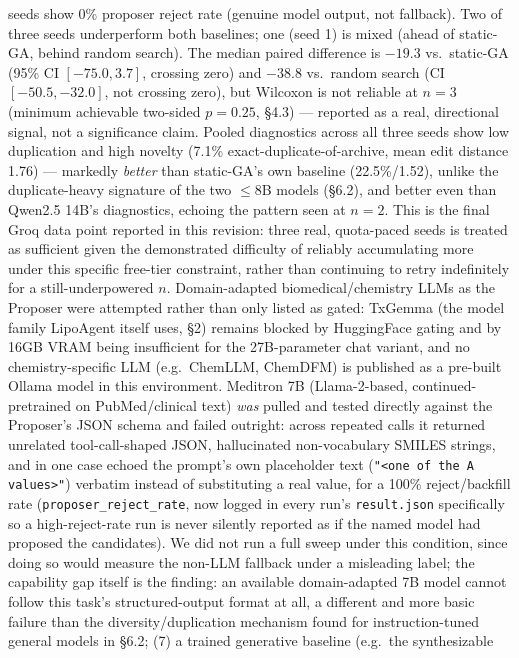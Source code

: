 \documentclass{article}
\begin{document}
seeds show 0\% proposer reject rate (genuine model output, not fallback).
Two of three seeds underperform both baselines; one (seed 1) is mixed
(ahead of static-GA, behind random search). The median paired difference
is $-19.3$ vs.\ static-GA (95\% CI $[-75.0, 3.7]$, crossing zero) and
$-38.8$ vs.\ random search (CI $[-50.5, -32.0]$, not crossing zero), but
Wilcoxon is not reliable at $n=3$ (minimum achievable two-sided
$p=0.25$, \S4.3) --- reported as a real, directional signal, not a
significance claim. Pooled diagnostics across all three seeds show low
duplication and high novelty (7.1\% exact-duplicate-of-archive, mean edit
distance 1.76) --- markedly \emph{better} than static-GA's own baseline
(22.5\%/1.52), unlike the duplicate-heavy signature of the two $\le$8B
models (\S6.2), and better even than Qwen2.5 14B's diagnostics, echoing
the pattern seen at $n=2$. This is the final Groq data point reported in
this revision: three real, quota-paced seeds is treated as sufficient
given the demonstrated difficulty of reliably accumulating more under
this specific free-tier constraint, rather than continuing to retry
indefinitely for a still-underpowered $n$. Domain-adapted biomedical/chemistry LLMs as the Proposer were
attempted rather than only listed as gated: TxGemma (the model family
LipoAgent itself uses, \S2) remains blocked by HuggingFace gating and by
16GB VRAM being insufficient for the 27B-parameter chat variant, and no
chemistry-specific LLM (e.g.\ ChemLLM, ChemDFM) is published as a
pre-built Ollama model in this environment. Meditron 7B (Llama-2-based,
continued-pretrained on PubMed/clinical text) \emph{was} pulled and
tested directly against the Proposer's JSON schema and failed outright:
across repeated calls it returned unrelated tool-call-shaped JSON,
hallucinated non-vocabulary SMILES strings, and in one case echoed the
prompt's own placeholder text (\texttt{"<one of the A values>"})
verbatim instead of substituting a real value, for a 100\%
reject/backfill rate (\texttt{proposer\_reject\_rate}, now logged in
every run's \texttt{result.json} specifically so a high-reject-rate run
is never silently reported as if the named model had proposed the
candidates). We did not run a full sweep under this condition, since
doing so would measure the non-LLM fallback under a misleading label; the
capability gap itself is the finding: an available domain-adapted 7B
model cannot follow this task's structured-output format at all, a
different and more basic failure than the diversity/duplication mechanism
found for instruction-tuned general models in \S6.2; (7) a trained generative baseline (e.g.\ the synthesizable
\end{document}
